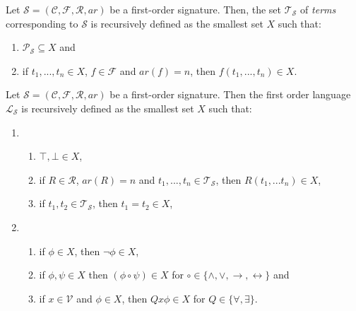 \begin{definition}\label{def:FO-term}
    Let $\mathcal{S} = (\mathcal{C},\mathcal{F},\mathcal{R},ar)$ be a first-order signature. Then, the set $\mathcal{T}_{\mathcal{S}}$ of \textit{terms} corresponding to $\mathcal{S}$ is recursively defined as the smallest set $X$ such that:
    \begin{enumerate}
        \item $\mathcal{P}_{\mathcal{S}} \subseteq X$ and
        \item if $t_1,...,t_n \in X$, $f \in \mathcal{F}$ and $ar(f) = n$, then $f(t_1,...,t_n) \in X$.
    \end{enumerate}
\end{definition}

\begin{definition}\label{def:FO-language}
    Let $\mathcal{S} = (\mathcal{C},\mathcal{F},\mathcal{R},ar)$ be a first-order signature. Then the first order language $\mathcal{L}_{\mathcal{S}}$ is recursively defined as the smallest set $X$ such that:
    \begin{enumerate}
        \item \begin{enumerate}
            \item $\top,\bot \in X$,
            \item if $R \in \mathcal{R}$, $ar(R) = n$ and $t_1,...,t_n \in \mathcal{T}_{\mathcal{S}}$, then $R(t_1,...t_n) \in X$,
            \item if $t_1,t_2 \in \mathcal{T}_{\mathcal{S}}$, then $t_1 = t_2 \in X$, 
        \end{enumerate}
        \item \begin{enumerate}
            \item if $\phi \in X$, then $\neg \phi \in X$,
            \item if $\phi, \psi \in X$ then $(\phi \circ \psi) \in X$ for $\circ \in \{\land,\lor,\to,\leftrightarrow\}$ and
            \item if $x \in \mathcal{V}$ and $\phi \in X$, then $Qx\phi \in X$ for $Q \in \{\forall,\exists\}$.
        \end{enumerate}
    \end{enumerate}
\end{definition}

